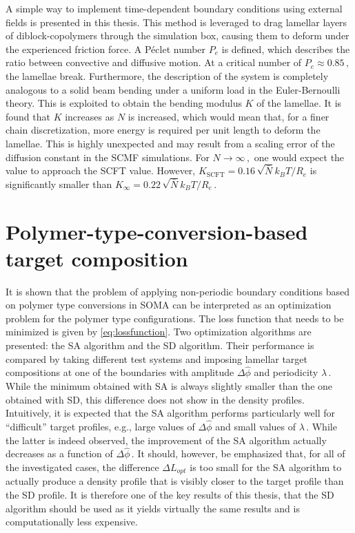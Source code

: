 \documentclass[bachelor,       %
               oneside,        %
               BCOR10mm,       %
               ngerman, english %
               ]{GAUBM}
\begin{document}
A simple way to implement time-dependent boundary conditions using external fields is presented in this thesis. This method is leveraged to drag lamellar layers of diblock-copolymers through the simulation box, causing them to deform under the experienced friction force. A P\'eclet number $P_e$ is defined, which describes the ratio between convective and diffusive motion. At a critical number of $P_e\approx 0.85\,,$ the lamellae break. Furthermore, the description of the system is completely analogous to a solid beam bending under a uniform load in the Euler-Bernoulli theory. This is exploited to obtain the bending modulus $K$ of the lamellae. It is found that $K$ increases as $N$ is increased, which would mean that, for a finer chain discretization, more energy is required per unit length to deform the lamellae. This is highly unexpected and may result from a scaling error of the diffusion constant in the \ac{SCMF} simulations. For $N\rightarrow\infty\,,$ one would expect the value to approach the \ac{SCFT} value. However, $K_\text{SCFT}=0.16\,\sqrt{\bar N}k_BT/R_e$ is significantly smaller than $K_\infty=0.22\,\sqrt{\bar N}k_BT/R_e\,.$

\section{Polymer-type-conversion-based target composition}

It is shown that the problem of applying non-periodic boundary conditions based on polymer type conversions in \ac{SOMA} can be interpreted as an optimization problem for the polymer type configurations. The loss function that needs to be minimized is given by \autoref{eq:lossfunction}. Two optimization algorithms are presented: the \ac{SA} algorithm and the \ac{SD} algorithm. Their performance is compared by taking different test systems and imposing lamellar target compositions at one of the boundaries with amplitude $\Delta\hat\phi$ and periodicity $\lambda\,.$ While the minimum obtained with \ac{SA} is always slightly smaller than the one obtained with \ac{SD}, this difference does not show in the density profiles. Intuitively, it is expected that the \ac{SA} algorithm performs particularly well for \enquote{difficult} target profiles, e.g., large values of $\Delta\hat\phi$ and small values of $\lambda\,.$ While the latter is indeed observed, the improvement of the \ac{SA} algorithm actually decreases as a function of $\Delta\hat\phi\,.$ It should, however, be emphasized that, for all of the investigated cases, the difference $\Delta L_{opt}$ is too small for the \ac{SA} algorithm to actually produce a density profile that is visibly closer to the target profile than the \ac{SD} profile. It is therefore one of the key results of this thesis, that the \ac{SD} algorithm should be used as it yields virtually the same results and is computationally less expensive. \\
\end{document}

